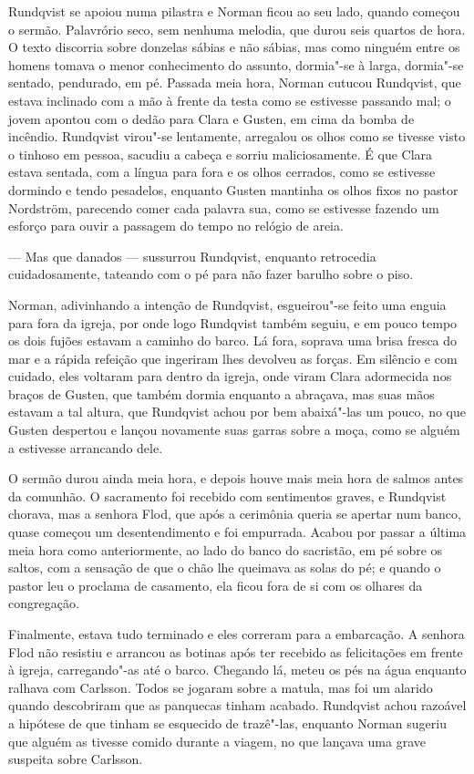 Rundqvist se apoiou numa pilastra e Norman ficou ao seu lado, quando começou o
sermão. Palavrório seco, sem nenhuma melodia, que durou seis quartos de hora. O
texto discorria sobre donzelas sábias e não sábias, mas como ninguém entre os
homens tomava o menor conhecimento do assunto, dormia"-se à larga, dormia"-se
sentado, pendurado, em pé. Passada meia hora, Norman cutucou Rundqvist, que
estava inclinado com a mão à frente da testa como se estivesse passando mal; o
jovem apontou com o dedão para Clara e Gusten, em cima da bomba de incêndio.
Rundqvist virou"-se lentamente, arregalou os olhos como se tivesse visto o tinhoso em
pessoa, sacudiu a cabeça e sorriu maliciosamente. É que Clara estava sentada,
com a língua para fora e os olhos cerrados, como se estivesse dormindo
e tendo pesadelos, enquanto Gusten mantinha os olhos fixos no pastor Nordström, parecendo comer
cada palavra sua, como se estivesse fazendo um esforço para ouvir a passagem do
tempo no relógio de areia. 

--- Mas que danados --- sussurrou Rundqvist, enquanto
retrocedia cuidadosamente, tateando com o pé para não fazer barulho sobre o piso. 

Norman, adivinhando a intenção de Rundqvist, esgueirou"-se feito uma enguia
para fora da igreja, por onde logo Rundqvist também seguiu, e em pouco tempo os
dois fujões estavam a caminho do barco. Lá fora, soprava uma brisa fresca do mar
e a rápida refeição que ingeriram lhes devolveu as forças. Em silêncio e com
cuidado, eles voltaram para dentro da igreja, onde viram Clara adormecida nos
braços de Gusten, que também dormia enquanto a abraçava, mas suas mãos
estavam a tal altura, que Rundqvist achou por bem abaixá"-las um pouco, no que
Gusten despertou e lançou novamente suas garras sobre a moça, como se alguém
a estivesse arrancando dele.

O sermão durou ainda meia hora, e depois houve mais meia hora de salmos
antes da comunhão. O sacramento foi recebido com sentimentos graves, e Rundqvist
chorava, mas a senhora Flod, que após a cerimônia queria se apertar num banco,
quase começou um desentendimento e foi empurrada. Acabou por passar a última meia
hora como anteriormente, ao lado do banco do sacristão, em pé sobre os saltos, com
a sensação de que o chão lhe queimava as solas do pé; e quando o pastor leu  
o proclama de casamento, ela ficou fora de si com os olhares da congregação.

Finalmente, estava tudo terminado e eles correram para a embarcação. A senhora Flod
não resistiu e arrancou as botinas após ter recebido as felicitações em frente à
igreja, carregando"-as até o barco. Chegando lá, meteu os pés na água enquanto
ralhava com Carlsson. Todos se jogaram sobre a matula, mas foi um alarido quando
descobriram que as panquecas tinham acabado. Rundqvist achou razoável a hipótese
de que tinham se esquecido de trazê"-las, enquanto Norman sugeriu que alguém as
tivesse comido durante a viagem, no que lançava uma grave suspeita sobre Carlsson.

